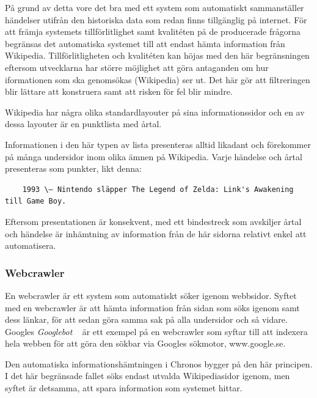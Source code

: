 \documentclass[a4paper, 11pt]{article}
\begin{document}
På grund av detta vore det bra med ett system som automatiskt sammanställer händelser utifrån den historiska data som redan finns tillgänglig på internet. För att främja systemets tillförlitlighet samt kvalitéten på de producerade frågorna begränsas det automatiska systemet till att endast hämta information från Wikipedia. Tillförlitligheten och kvalitéten kan höjas med den här begränsningen eftersom utvecklarna har större möjlighet att göra antaganden om hur iformationen som ska genomsökas (Wikipedia) ser ut. Det här gör att filtreringen blir lättare att konstruera samt att risken för fel blir mindre.

Wikipedia har några olika standardlayouter på sina informationssidor och en av dessa layouter är en punktlista med årtal. 


Informationen i den här typen av lista presenteras alltid likadant och förekommer på många undersidor inom olika ämnen på Wikipedia. Varje händelse och årtal presenteras som punkter, likt denna:

\begin{verbatim}
	1993 \– Nintendo släpper The Legend of Zelda: Link's Awakening till Game Boy.
\end{verbatim}

Eftersom presentationen är konsekvent, med ett bindestreck som avskiljer årtal och händelse är inhämtning av information från de här sidorna relativt enkel att automatisera.

\subsubsection{Webcrawler}

En webcrawler är ett system som automatiskt söker igenom webbsidor. Syftet med en webcrawler är att hämta information från sidan som söks igenom samt dess länkar, för att sedan göra samma sak på alla undersidor och så vidare. Googles \textit{Googlebot} ~\cite{googlebot} är ett exempel på en webcrawler som syftar till att indexera hela webben för att göra den sökbar via Googles sökmotor, www.google.se.


Den automatiska informationshämtningen i Chronos bygger på den här principen. I det här begränsade fallet söks endast utvalda Wikipediasidor igenom, men syftet är detsamma, att spara information som systemet hittar. 
\end{document}
